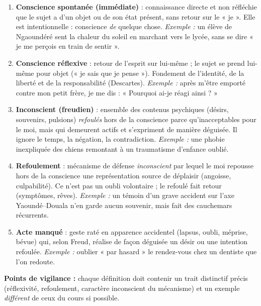 \documentclass[11pt]{article}
\begin{document}
\begin{corrige}
\begin{enumerate}
\item \textbf{Conscience spontanée (immédiate)} : connaissance directe et non réfléchie que le sujet a d'un objet ou de son état présent, sans retour sur le « je ». Elle est intentionnelle : conscience \emph{de} quelque chose. \emph{Exemple :} un élève de Ngaoundéré sent la chaleur du soleil en marchant vers le lycée, sans se dire « je me perçois en train de sentir ».
\item \textbf{Conscience réflexive} : retour de l'esprit sur lui-même ; le sujet se prend lui-même pour objet (« je sais que je pense »). Fondement de l'identité, de la liberté et de la responsabilité (Descartes). \emph{Exemple :} après m'être emporté contre mon petit frère, je me dis : « Pourquoi ai-je réagi ainsi ? »
\item \textbf{Inconscient (freudien)} : ensemble des contenus psychiques (désirs, souvenirs, pulsions) \emph{refoulés} hors de la conscience parce qu'inacceptables pour le moi, mais qui demeurent actifs et s'expriment de manière déguisée. Il ignore le temps, la négation, la contradiction. \emph{Exemple :} une phobie inexpliquée des chiens remontant à un traumatisme d'enfance oublié.
\item \textbf{Refoulement} : mécanisme de défense \emph{inconscient} par lequel le moi repousse hors de la conscience une représentation source de déplaisir (angoisse, culpabilité). Ce n'est pas un oubli volontaire ; le refoulé fait retour (symptômes, rêves). \emph{Exemple :} un témoin d'un grave accident sur l'axe Yaoundé--Douala n'en garde aucun souvenir, mais fait des cauchemars récurrents.
\item \textbf{Acte manqué} : geste raté en apparence accidentel (lapsus, oubli, méprise, bévue) qui, selon Freud, réalise de façon déguisée un désir ou une intention refoulée. \emph{Exemple :} oublier « par hasard » le rendez-vous chez un dentiste que l'on redoute.
\end{enumerate}
\textbf{Points de vigilance :} chaque définition doit contenir un trait distinctif précis (réflexivité, refoulement, caractère inconscient du mécanisme) et un exemple \emph{différent} de ceux du cours si possible.
\end{corrige}
\end{document}
